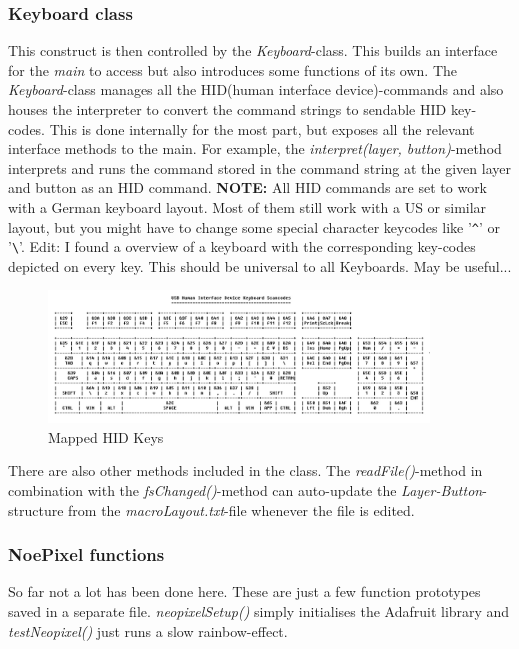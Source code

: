 \documentclass[english, 12pt]{scrartcl}
\begin{document}
	\subsubsection{Keyboard class}
	This construct is then controlled by the \textit{Keyboard}-class. This builds an interface for the \textit{main} to access but also introduces some functions of its own. The \textit{Keyboard}-class manages all the HID(human interface device)-commands and also houses the interpreter to convert the command strings to sendable HID key-codes. This is done internally for the most part, but exposes all the relevant interface methods to the main. For example, the \textit{interpret(layer, button)}-method interprets and runs the command stored in the command string at the given layer and button as an HID command.\newline
	\textbf{NOTE:} All HID commands are set to work with a German keyboard layout. Most of them still work with a US or similar layout, but you might have to change some special character keycodes like '\verb=^=' or '\verb=\='.\newline
	Edit: I found a overview of a keyboard with the corresponding key-codes depicted on every key. This should be universal to all Keyboards. May be useful...
	\begin{figure}[H]
		\centering
		\includegraphics[width=0.9\textwidth]{HIDkeys}
		\caption{Mapped HID Keys}
	\end{figure}
	
	\noindent There are also other methods included in the class. The \textit{readFile()}-method in combination with the \textit{fsChanged()}-method can auto-update the \textit{Layer-Button}-structure from the \textit{macroLayout.txt}-file whenever the file is edited.
	\subsubsection{NoePixel functions}
	So far not a lot has been done here. These are just a few function prototypes saved in a separate file. \textit{neopixelSetup()} simply initialises the Adafruit library and \textit{testNeopixel()} just runs a slow rainbow-effect.
\end{document}
